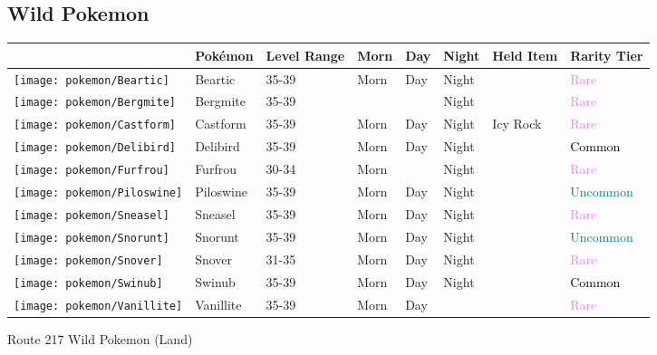 \subsection{Wild Pokemon}%
\label{subsec:WildPokemon}%
\begin{longtable}{||l l l l l l l l||}%
\hline%
&Pokémon&Level Range&Morn&Day&Night&Held Item&Rarity Tier\\%
\hline%
\endhead%
\hline%
\texttt{[image: pokemon/Beartic]}&Beartic&35{-}39&Morn&Day&Night&&\textcolor{violet}{%
Rare%
}\\%
\hline%
\texttt{[image: pokemon/Bergmite]}&Bergmite&35{-}39&&&Night&&\textcolor{violet}{%
Rare%
}\\%
\hline%
\texttt{[image: pokemon/Castform]}&Castform&35{-}39&Morn&Day&Night&Icy Rock&\textcolor{violet}{%
Rare%
}\\%
\hline%
\texttt{[image: pokemon/Delibird]}&Delibird&35{-}39&Morn&Day&Night&&\textcolor{black}{%
Common%
}\\%
\hline%
\texttt{[image: pokemon/Furfrou]}&Furfrou&30{-}34&Morn&&Night&&\textcolor{violet}{%
Rare%
}\\%
\hline%
\texttt{[image: pokemon/Piloswine]}&Piloswine&35{-}39&Morn&Day&Night&&\textcolor{teal}{%
Uncommon%
}\\%
\hline%
\texttt{[image: pokemon/Sneasel]}&Sneasel&35{-}39&Morn&Day&Night&&\textcolor{violet}{%
Rare%
}\\%
\hline%
\texttt{[image: pokemon/Snorunt]}&Snorunt&35{-}39&Morn&Day&Night&&\textcolor{teal}{%
Uncommon%
}\\%
\hline%
\texttt{[image: pokemon/Snover]}&Snover&31{-}35&Morn&Day&Night&&\textcolor{violet}{%
Rare%
}\\%
\hline%
\texttt{[image: pokemon/Swinub]}&Swinub&35{-}39&Morn&Day&Night&&\textcolor{black}{%
Common%
}\\%
\hline%
\texttt{[image: pokemon/Vanillite]}&Vanillite&35{-}39&Morn&Day&&&\textcolor{violet}{%
Rare%
}\\%
\hline%
\end{longtable}%
\caption{Route 217 Wild Pokemon (Land)}